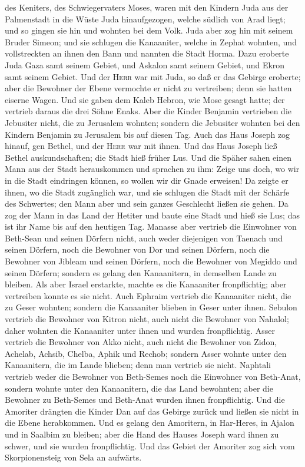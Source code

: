 des Keniters, des Schwiegervaters Moses, waren mit den Kindern Juda aus
der Palmenstadt in die Wüste Juda hinaufgezogen, welche südlich von Arad
liegt; und so gingen sie hin und wohnten bei dem Volk. 
Juda aber zog hin mit seinem Bruder Simeon; und sie schlugen die
Kanaaniter, welche in Zephat wohnten, und vollstreckten an ihnen den
Bann und nannten die Stadt Horma.  Dazu eroberte Juda
Gaza samt seinem Gebiet, und Askalon samt seinem Gebiet, und Ekron samt
seinem Gebiet.  Und der \textsc{Herr} war mit Juda, so
daß er das Gebirge eroberte; aber die Bewohner der Ebene vermochte er
nicht zu vertreiben; denn sie hatten eiserne Wagen.  Und
sie gaben dem Kaleb Hebron, wie Mose gesagt hatte; der vertrieb daraus
die drei Söhne Enaks.  Aber die Kinder Benjamin
vertrieben die Jebusiter nicht, die zu Jerusalem wohnten; sondern die
Jebusiter wohnten bei den Kindern Benjamin zu Jerusalem bis auf diesen
Tag.  Auch das Haus Joseph zog hinauf, gen Bethel, und
der \textsc{Herr} war mit ihnen.  Und das Haus Joseph
ließ Bethel auskundschaften; die Stadt hieß früher Lus. 
Und die Späher sahen einen Mann aus der Stadt herauskommen und sprachen
zu ihm: Zeige uns doch, wo wir in die Stadt eindringen können, so wollen
wir dir Gnade erweisen!  Da zeigte er ihnen, wo die Stadt
zugänglich war, und sie schlugen die Stadt mit der Schärfe des
Schwertes; den Mann aber und sein ganzes Geschlecht ließen sie gehen.
 Da zog der Mann in das Land der Hetiter und baute eine
Stadt und hieß sie Lus; das ist ihr Name bis auf den heutigen Tag.
 Manasse aber vertrieb die Einwohner von Beth-Sean und
seinen Dörfern nicht, auch weder diejenigen von Taenach und seinen
Dörfern, noch die Bewohner von Dor und seinen Dörfern, noch die Bewohner
von Jibleam und seinen Dörfern, noch die Bewohner von Megiddo und seinen
Dörfern; sondern es gelang den Kanaanitern, in demselben Lande zu
bleiben.  Als aber Israel erstarkte, machte es die
Kanaaniter fronpflichtig; aber vertreiben konnte es sie nicht.
 Auch Ephraim vertrieb die Kanaaniter nicht, die zu Geser
wohnten; sondern die Kanaaniter blieben in Geser unter ihnen.
 Sebulon vertrieb die Bewohner von Kitron nicht, auch
nicht die Bewohner von Nahalol; daher wohnten die Kanaaniter unter ihnen
und wurden fronpflichtig.  Asser vertrieb die Bewohner
von Akko nicht, auch nicht die Bewohner von Zidon, Achelab, Achsib,
Chelba, Aphik und Rechob;  sondern Asser wohnte unter den
Kanaanitern, die im Lande blieben; denn man vertrieb sie nicht.
 Naphtali vertrieb weder die Bewohner von Beth-Semes noch
die Einwohner von Beth-Anat, sondern wohnte unter den Kanaanitern, die
das Land bewohnten; aber die Bewohner zu Beth-Semes und Beth-Anat wurden
ihnen fronpflichtig.  Und die Amoriter drängten die
Kinder Dan auf das Gebirge zurück und ließen sie nicht in die Ebene
herabkommen.  Und es gelang den Amoritern, in Har-Heres,
in Ajalon und in Saalbim zu bleiben; aber die Hand des Hauses Joseph
ward ihnen zu schwer, und sie wurden fronpflichtig.  Und
das Gebiet der Amoriter zog sich vom Skorpionensteig von Sela an
aufwärts.

